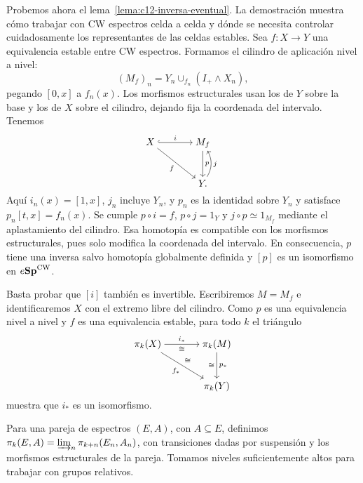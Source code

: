 Probemos ahora el lema~\ref{lema:c12-inversa-eventual}. La demostración muestra cómo trabajar con CW espectros celda a celda y dónde se necesita controlar cuidadosamente los representantes de las celdas estables. Sea $f\colon X\to Y$ una equivalencia estable entre CW espectros. Formamos el cilindro de aplicación nivel a nivel:
\[
(M_f)_n=Y_n\cup_{f_n}(I_+\wedge X_n),
\]
pegando $[0,x]$ a $f_n(x)$. Los morfismos estructurales usan los de $Y$ sobre la base y los de $X$ sobre el cilindro, dejando fija la coordenada del intervalo. Tenemos
\[
\begin{tikzcd}[cramped,column sep=large,row sep=large]
X \arrow[r,hook,"i"] \arrow[dr,"f"'] & M_f \arrow[d,"p"]\\
& Y \arrow[u,bend right=30,"j"'].
\end{tikzcd}
\]
Aquí $i_n(x)=[1,x]$, $j_n$ incluye $Y_n$, y $p_n$ es la identidad sobre $Y_n$ y satisface $p_n[t,x]=f_n(x)$. Se cumple $p\circ i=f$, $p\circ j=1_Y$ y $j\circ p\simeq1_{M_f}$ mediante el aplastamiento del cilindro. Esa homotopía es compatible con los morfismos estructurales, pues solo modifica la coordenada del intervalo. En consecuencia, $p$ tiene una inversa salvo homotopía globalmente definida y $[p]$ es un isomorfismo en $e\mathbf{Sp}^{\mathrm{CW}}$.

Basta probar que $[i]$ también es invertible. Escribiremos $M=M_f$ e identificaremos $X$ con el extremo libre del cilindro. Como $p$ es una equivalencia nivel a nivel y $f$ es una equivalencia estable, para todo $k$ el triángulo
\[
\begin{tikzcd}[cramped,column sep=large,row sep=large]
\pi_k(X) \arrow[r,"i_*","\cong"'] \arrow[dr,"f_*"',"\cong"]
& \pi_k(M) \arrow[d,"p_*","\cong"']\\
& \pi_k(Y)
\end{tikzcd}
\]
muestra que $i_*$ es un isomorfismo.

Para una pareja de espectros $(E,A)$, con $A\subseteq E$, definimos $\pi_k(E,A)=\varinjlim\nolimits_n\pi_{k+n}(E_n,A_n)$, con transiciones dadas por suspensión y los morfismos estructurales de la pareja. Tomamos niveles suficientemente altos para trabajar con grupos relativos.

